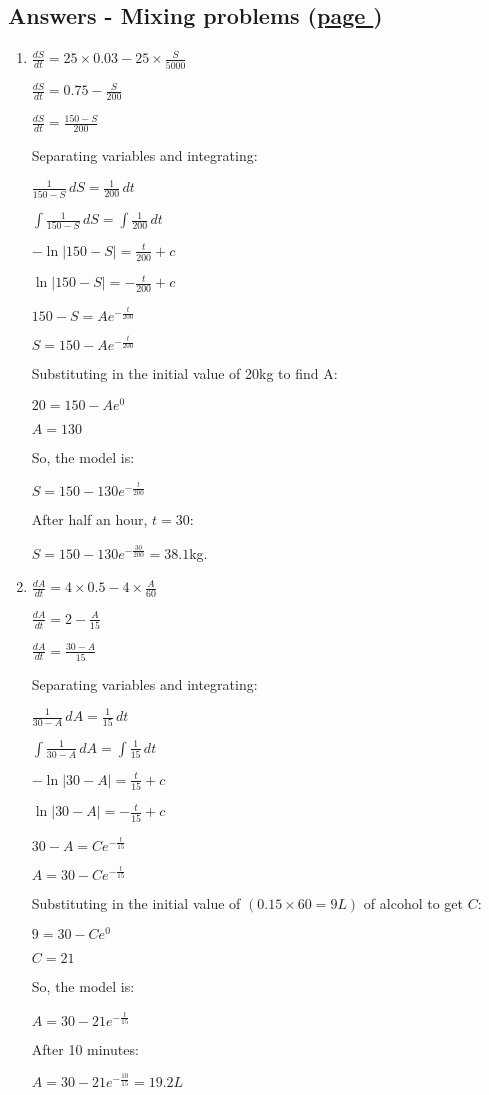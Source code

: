 \documentclass[../main.tex]{subfiles}
\begin{document}
\hypertarget{mixinganswers}{\subsection*{Answers - Mixing problems (\hyperlink{mixinglink}{page \pageref{Mixing problems}})}}

\label{Mixing problems answers}
\begin{enumerate}[itemsep=0.7cm]
    \item 
    $\frac{dS}{dt}=25 \times 0.03 - 25 \times \frac{S}{5000}$

    $\frac{dS}{dt}=0.75 - \frac{S}{200}$

    $\frac{dS}{dt}=\frac{150-S}{200}$

    Separating variables and integrating:

    $\frac{1}{150-S}\,dS=\frac{1}{200}\,dt$

    $\int \frac{1}{150-S}\,dS=\int \frac{1}{200}\,dt$

    $-\ln|150-S|=\frac{t}{200}+c$

    $\ln|150-S|=-\frac{t}{200}+c$

    $150-S=Ae^{-\frac{t}{200}}$

    $S=150-Ae^{-\frac{t}{200}}$

    Substituting in the initial value of 20kg to find A:

    $20=150-Ae^{0}$

    $A=130$

    So, the model is:

    $S=150-130e^{-\frac{t}{200}}$

    After half an hour, $t=30$:

    $S=150-130e^{-\frac{30}{200}}=38.1$kg.

    \item
    $\frac{dA}{dt}=4 \times 0.5 - 4\times \frac{A}{60}$

    $\frac{dA}{dt}=2-\frac{A}{15}$

    $\frac{dA}{dt}=\frac{30-A}{15}$

    Separating variables and integrating:

    $\frac{1}{30-A}\,dA=\frac{1}{15}\,dt$

    $\int \frac{1}{30-A}\,dA=\int \frac{1}{15}\,dt$

    $-\ln|30-A|=\frac{t}{15}+c$

    $\ln|30-A|=-\frac{t}{15}+c$

    $30-A=Ce^{-\frac{t}{15}}$

    $A=30-Ce^{-\frac{t}{15}}$

    Substituting in the initial value of $(0.15 \times 60=9L)$ of alcohol to get $C$:

    $9=30-Ce^{0}$

    $C=21$

    So, the model is:

    $A=30-21e^{-\frac{t}{15}}$

    After 10 minutes:

    $A=30-21e^{-\frac{10}{15}}=19.2L$

\end{enumerate}
\end{document}
